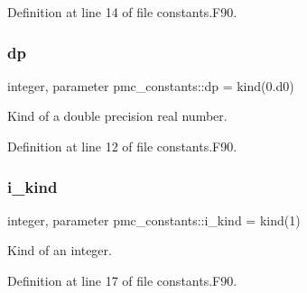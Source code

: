 Definition at line 14 of file constants.\+F90.

\mbox{\label{namespacepmc__constants_a396b7709ed4da67dac74cb46a1466ed6}} 
\subsubsection{\texorpdfstring{dp}{dp}}
{\footnotesize\ttfamily integer, parameter pmc\+\_\+constants\+::dp = kind(0.d0)}



Kind of a double precision real number. 



Definition at line 12 of file constants.\+F90.

\mbox{\label{namespacepmc__constants_ad57f27d7f8ba14bb7c713f6603c3a532}} 
\subsubsection{\texorpdfstring{i\+\_\+kind}{i\_kind}}
{\footnotesize\ttfamily integer, parameter pmc\+\_\+constants\+::i\+\_\+kind = kind(1)}



Kind of an integer. 



Definition at line 17 of file constants.\+F90.

